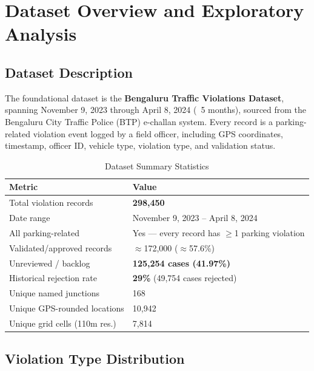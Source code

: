 \documentclass[12pt,a4paper]{article}
\begin{document}
\section{Dataset Overview and Exploratory Analysis}

\subsection{Dataset Description}

The foundational dataset is the \textbf{Bengaluru Traffic Violations Dataset}, spanning November 9, 2023 through April 8, 2024 (~5 months), sourced from the Bengaluru City Traffic Police (BTP) e-challan system. Every record is a parking-related violation event logged by a field officer, including GPS coordinates, timestamp, officer ID, vehicle type, violation type, and validation status.

\begin{table}[H]
\centering
\caption{Dataset Summary Statistics}
\begin{tabularx}{\textwidth}{lX}
\toprule
\textbf{Metric} & \textbf{Value} \\
\midrule
Total violation records & \textbf{298,450} \\
Date range & November 9, 2023 -- April 8, 2024 \\
All parking-related & Yes — every record has $\geq$1 parking violation \\
Validated/approved records & $\approx$172,000 ($\approx$57.6\%) \\
Unreviewed / backlog & \textbf{125,254 cases (41.97\%)} \\
Historical rejection rate & \textbf{29\%} (49,754 cases rejected) \\
Unique named junctions & 168 \\
Unique GPS-rounded locations & 10,942 \\
Unique grid cells (110m res.) & 7,814 \\
\bottomrule
\end{tabularx}
\end{table}

\subsection{Violation Type Distribution}
\end{document}
